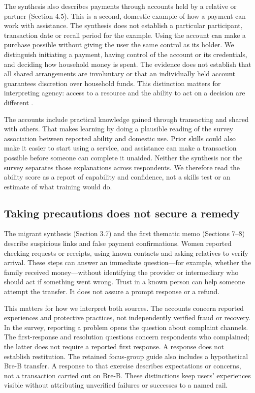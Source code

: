 The synthesis also describes payments through accounts held by a relative or partner (Section 4.5). This is a second, domestic example of how a payment can work with assistance. The synthesis does not establish a particular participant, transaction date or recall period for the example. Using the account can make a purchase possible without giving the user the same control as its holder. We distinguish initiating a payment, having control of the account or its credentials, and deciding how household money is spent. The evidence does not establish that all shared arrangements are involuntary or that an individually held account guarantees discretion over household funds. This distinction matters for interpreting agency: access to a resource and the ability to act on a decision are different \citep{kabeer1999}.

The accounts include practical knowledge gained through transacting and shared with others. That makes learning by doing a plausible reading of the survey association between reported ability and domestic use. Prior skills could also make it easier to start using a service, and assistance can make a transaction possible before someone can complete it unaided. Neither the synthesis nor the survey separates those explanations across respondents. We therefore read the ability score as a report of capability and confidence, not a skills test or an estimate of what training would do.

\subsection{Taking precautions does not secure a remedy}
\label{sec:migrant-recourse}

The migrant synthesis (Section 3.7) and the first thematic memo (Sections 7--8) describe suspicious links and false payment confirmations. Women reported checking requests or receipts, using known contacts and asking relatives to verify arrival. These steps can answer an immediate question---for example, whether the family received money---without identifying the provider or intermediary who should act if something went wrong. Trust in a known person can help someone attempt the transfer. It does not assure a prompt response or a refund.

This matters for how we interpret both sources. The accounts concern reported experiences and protective practices, not independently verified fraud or recovery. In the survey, reporting a problem opens the question about complaint channels. The first-response and resolution questions concern respondents who complained; the latter does not require a reported first response. A response does not establish restitution. The retained focus-group guide also includes a hypothetical Bre-B transfer. A response to that exercise describes expectations or concerns, not a transaction carried out on Bre-B. These distinctions keep users' experiences visible without attributing unverified failures or successes to a named rail.

